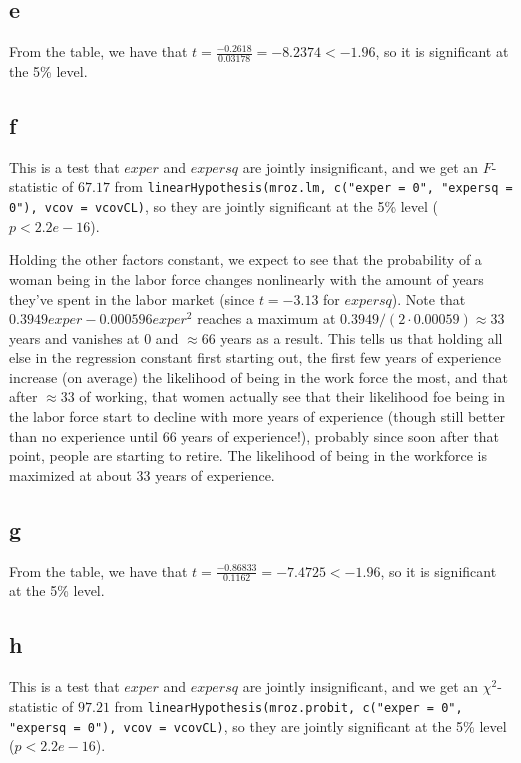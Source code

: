 \documentclass[12pt,letterpaper]{article}
\theoremstyle{definition}
\begin{document}
\subsection*{e}

From the table, we have that $t = \frac{-0.2618}{0.03178} = -8.2374 < -1.96$, so it is significant at the 5\% level.

\subsection*{f}

This is a test that $exper$ and $expersq$ are jointly insignificant, and we get an $F$-statistic of $67.17$ from \verb|linearHypothesis(mroz.lm, c("exper = 0", "expersq = 0"), vcov = vcovCL)|, so they are jointly significant at the 5\% level ($p < 2.2e-16$).

Holding the other factors constant, we expect to see that the probability of a woman being in the labor force changes nonlinearly with the amount of years they've spent in the labor market (since $t = -3.13$ for $expersq$). Note that $0.3949exper - 0.000596exper^{2}$ reaches a maximum at $0.3949 / (2 \cdot 0.00059) \approx 33$ years and vanishes at 0 and $\approx 66$ years as a result. This tells us that holding all else in the regression constant first starting out, the first few years of experience increase (on average) the likelihood of being in the work force the most, and that after $\approx 33$ of working, that women actually see that their likelihood foe being in the labor force start to decline with more years of experience (though still better than no experience until 66 years of experience!), probably since soon after that point, people are starting to retire. The likelihood of being in the workforce is maximized at about 33 years of experience.

\subsection*{g}

From the table, we have that $t = \frac{-0.86833}{0.1162} = -7.4725 < -1.96$, so it is significant at the 5\% level.

\subsection*{h}

This is a test that $exper$ and $expersq$ are jointly insignificant, and we get an $\chi^{2}$-statistic of $97.21$ from \verb|linearHypothesis(mroz.probit, c("exper = 0", "expersq = 0"), vcov = vcovCL)|, so they are jointly significant at the 5\% level ($p < 2.2e-16$).
\end{document}
